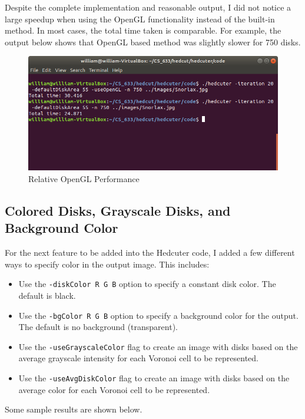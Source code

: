 \documentclass[11pt]{article}
\begin{document}
Despite the complete implementation and reasonable output, I did not notice a large speedup when using the OpenGL functionality instead of the built-in method. In most cases, the total time taken is comparable. For example, the output below shows that OpenGL based method was slightly slower for 750 disks.

\begin{figure}[H]
	\centering
	\includegraphics[scale=0.35]{OpenGL-Performance}
	\caption{Relative OpenGL Performance}
	\label{fig:OpenGLPerformance}
\end{figure} 

\subsection{Colored Disks, Grayscale Disks, and Background Color}

For the next feature to be added into the Hedcuter code, I added a few different ways to specify color in the output image. This includes:

\begin{itemize}
	\item Use the \verb|-diskColor R G B| option to specify a constant disk color. The default is black.
	\item Use the \verb|-bgColor R G B| option to specify a background color for the output. The default is no background (transparent).
	\item Use the \verb|-useGrayscaleColor| flag to create an image with disks based on the average grayscale intensity for each Voronoi cell to be represented.
	\item Use the \verb|-useAvgDiskColor| flag to create an image with disks based on the average color for each Voronoi cell to be represented.
\end{itemize} 

Some sample results are shown below.
\end{document}
